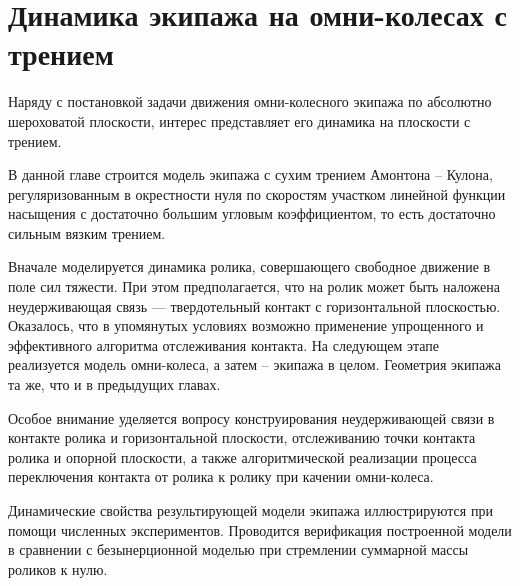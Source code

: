 \chapter{Динамика экипажа на омни-колесах с трением}

Наряду с постановкой задачи движения омни-колесного экипажа по абсолютно шероховатой плоскости, интерес представляет его динамика на плоскости с трением.

В данной главе строится модель экипажа с сухим трением Амонтона -- Кулона, регуляризованным в окрестности нуля по скоростям участком линейной функции насыщения с достаточно большим угловым коэффициентом, то есть достаточно сильным вязким трением.

Вначале моделируется динамика ролика, совершающего свободное движение в поле сил тяжести.
При этом предполагается, что на ролик может быть наложена неудерживающая связь --- твердотельный контакт с горизонтальной плоскостью. 
Оказалось, что в упомянутых условиях возможно применение упрощенного и эффективного алгоритма отслеживания контакта.
На следующем этапе реализуется модель омни-колеса, а затем -- экипажа в целом.
Геометрия экипажа та же, что и в предыдущих главах.

Особое внимание уделяется вопросу конструирования неудерживающей связи в контакте ролика и горизонтальной плоскости,
отслеживанию точки контакта ролика и опорной плоскости,
а также алгоритмической реализации процесса 
переключения контакта от ролика к ролику при качении омни-колеса.

Динамические свойства результирующей модели экипажа иллюстрируются при помощи численных экспериментов.
Проводится верификация построенной модели в сравнении с безынерционной моделью при стремлении суммарной массы роликов к нулю.
